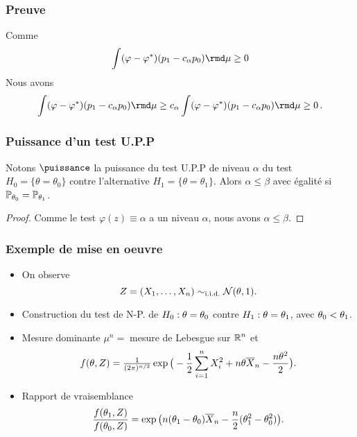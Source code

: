 \begin{frame}
\frametitle{Preuve}
{Comme 
$$
\int (\varphi - \varphi^*) (p_1 - c_\alpha p_0) \rmd \mu \geq 0
$$
Nous avons
$$
\int (\varphi - \varphi^*) (p_1 - c_\alpha p_0) \rmd \mu \geq c_\alpha \int (\varphi - \varphi^*) (p_1 - c_\alpha p_0) \rmd \mu \geq 0 \eqsp.
$$
}
\end{frame}

\begin{frame}
\frametitle{Puissance d'un test U.P.P}
\begin{lemma}
Notons $\puissance$ la puissance du test U.P.P de niveau $\alpha$ du test $H_0= \{\theta = \theta_0\}$ contre l'alternative $H_1= \{\theta=\theta_1\}$. Alors $\alpha \leq \beta$ avec égalité si $\operatorname{{\mathbb P}}_{\theta_0}= \operatorname{{\mathbb P}}_{\theta_1}$.
\end{lemma}
\begin{proof}
Comme le test $\varphi(z) \equiv \alpha$ a un niveau $\alpha$, nous avons $\alpha \leq \beta$.  
\end{proof}
\end{frame}

\begin{frame}
\frametitle{Exemple de mise en oeuvre}
\begin{itemize}
\item On observe
$$Z=(X_1,\ldots, X_n) \sim_{\text{i.i.d.}} {\mathcal N}(\theta, 1).$$
\item \alert{Construction du test de N-P.} de $H_0:\theta = \theta_0$ contre $H_1:\theta = \theta_1$, avec $\theta_0 < \theta_1$.
\item \alert{Mesure dominante} $\mu^n=\;$mesure de Lebesgue sur $\operatorname{{\mathbb R}}^n$ et
$$f(\theta, Z)=\tfrac{1}{(2\pi)^{n/2}}\exp\big(-\frac{1}{2}\sum_{i = 1}^n X_i^2+n\theta\overline{X}_n-\frac{n\theta^2}{2}\big).$$
\item \alert{Rapport de vraisemblance}
$$\frac{f(\theta_1,Z)}{f(\theta_0,Z)} = \exp\big(n(\theta_1-\theta_0)\overline{X}_n-\frac{n}{2}(\theta_1^2-\theta_0^2)\big).$$
\end{itemize}
\end{frame}

